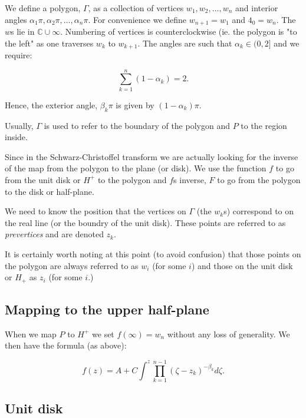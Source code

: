 \documentclass[a4paper,10pt]{amsart}
\newcommand{\sch}{Schwarz-Christoffel }
\begin{document}
\begin{defn}[Polygon]
We define a polygon, $\Gamma$, as a collection of vertices $w_1, w_2,\dots,w_n$ and interior angles $\alpha_1\pi, \alpha_2\pi, \dots, \alpha_n\pi$. For convenience we define $w_{n+1} = w_1$ and $4_0=w_n$. The $w$s lie in $\mathbb{C} \cup {\infty}$. Numbering of vertices is counterclockwise (ie. the polygon is "to the left" as one traverses $w_k$ to $w_{k+1}$. The angles are such that $\alpha_k \in (0,2]$ and we require:

\begin{equation}
\sum_{k=1}^n (1-\alpha_k) = 2.
\end{equation}

Hence, the exterior angle, $\beta_k\pi$ is given by $(1-\alpha_k)\pi$.

Usually, $\Gamma$ is used to refer to the boundary of the polygon and $P$ to the region inside.

\end{defn}

Since in the \sch transform we are actually looking for the inverse of the map from the polygon to the plane (or disk). We use the function $f$ to go from the unit disk or $H^+$ to the polygon and $f$s inverse, $F$ to go from the polygon to the disk or half-plane.  

We need to know the position that the vertices on $\Gamma$ (the $w_k$s) correspond to on the real line (or the boundry of the unit disk). These points are referred to as \emph{prevertices} and are denoted $z_k$.

It is certainly worth noting at this point (to avoid confusion) that those points on the polygon are always referred to as $w_i$ (for some $i$) and those on the unit disk or $H_+$ as $z_i$ (for some $i$.)




\subsection{Mapping to the upper half-plane}

When we map $P$ to $H^+$ we set $f(\infty) = w_n$ without any loss of generality. We then have the formula (as above):

\begin{equation}
f(z) = A + C \int^z \prod_{k=1}^{n-1} (\zeta-z_k)^{-\beta_k} d\zeta.
\end{equation}



\subsection{Unit disk}
\end{document}
